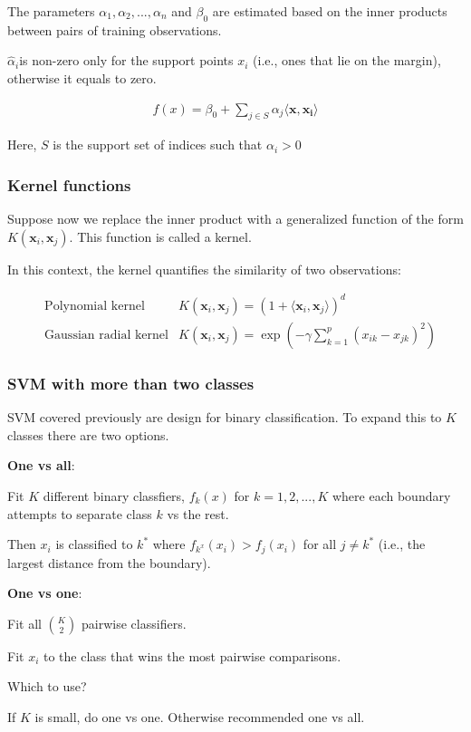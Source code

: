 The parameters $\alpha_1,\alpha_2,...,\alpha_n$ and $\beta_0$ are estimated based on the inner products between pairs of training observations.

$\hat{\alpha}_i$is non-zero only for the support points $x_i$ (i.e., ones that lie on the margin), otherwise it equals to zero.

\begin{align*}
    f(x) = \beta_0+\sum_{j\in S}\alpha_j\langle\boldsymbol{x},\boldsymbol{x_i}\rangle
\end{align*}

Here, $S$ is the support set of indices such that $\alpha_i>0$

\subsubsection{Kernel functions}

\indent 

Suppose now we replace the inner product with a generalized function of the form $K(\boldsymbol{x}_i,\boldsymbol{x}_j)$. This function is called a kernel.

In this context, the kernel quantifies the similarity of two observations:

\begin{align*}
    &\text{Polynomial kernel} & K(\boldsymbol{x}_i,\boldsymbol{x}_j) = (1+\langle\boldsymbol{x}_i,\boldsymbol{x}_j\rangle)^d\\
    &\text{Gaussian radial kernel} & K(\boldsymbol{x}_i,\boldsymbol{x}_j) = \exp(-\gamma\sum_{k=1}^p(x_{ik}-x_{jk})^2)
\end{align*}

\subsubsection{SVM with more than two classes}

\indent 

SVM covered previously are design for binary classification. To expand this to $K$ classes there are two options.

\bigskip

\noindent\textbf{One vs all}:

Fit $K$ different binary classfiers, $f_k(x)$ for $k=1,2,...,K$ where each boundary attempts to separate class $k$ vs the rest.

Then $x_i$ is classified to $k^*$ where $f_{k^x}(x_i)>f_j(x_i)$ for all $j\neq k^*$ (i.e., the largest distance from the boundary).

\bigskip

\noindent\textbf{One vs one}:

Fit all $\binom{K}{2}$ pairwise classifiers. 

Fit $x_i$ to the class that wins the most pairwise comparisons.

\bigskip

\noindent Which to use?

If $K$ is small, do one vs one. Otherwise recommended one vs all.